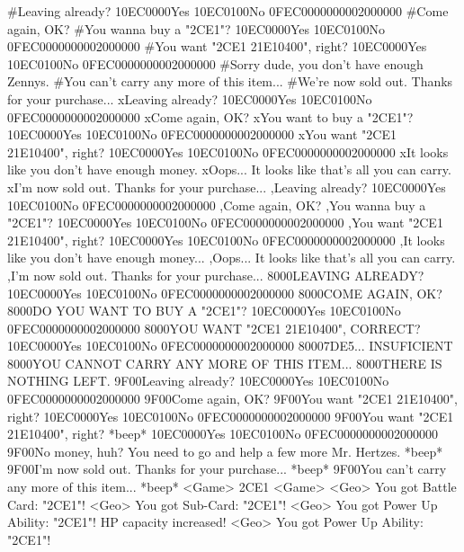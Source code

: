 #Leaving already? {10}{EC}{00}{00}Yes {10}{EC}{01}{00}No {0F}{EC}{00}{00}{00}{00}{02}{00}{00}{00}
#Come again, OK?
#You wanna buy a "{2C}{E1}"? {10}{EC}{00}{00}Yes {10}{EC}{01}{00}No {0F}{EC}{00}{00}{00}{00}{02}{00}{00}{00}
#You want "{2C}{E1} {21}{E1}{04}{00}", right? {10}{EC}{00}{00}Yes {10}{EC}{01}{00}No {0F}{EC}{00}{00}{00}{00}{02}{00}{00}{00}
#Sorry dude, you don't have enough Zennys. 
#You can't carry any more of this item... 
#We're now sold out. Thanks for your purchase... 
xLeaving already? {10}{EC}{00}{00}Yes {10}{EC}{01}{00}No {0F}{EC}{00}{00}{00}{00}{02}{00}{00}{00}
xCome again, OK?
xYou want to buy a "{2C}{E1}"? {10}{EC}{00}{00}Yes {10}{EC}{01}{00}No {0F}{EC}{00}{00}{00}{00}{02}{00}{00}{00}
xYou want "{2C}{E1} {21}{E1}{04}{00}", right? {10}{EC}{00}{00}Yes {10}{EC}{01}{00}No {0F}{EC}{00}{00}{00}{00}{02}{00}{00}{00}
xIt looks like you don't have enough money. 
xOops... It looks like that's all you can carry. 
xI'm now sold out. Thanks for your purchase... 
,Leaving already? {10}{EC}{00}{00}Yes {10}{EC}{01}{00}No {0F}{EC}{00}{00}{00}{00}{02}{00}{00}{00}
,Come again, OK?
,You wanna buy a "{2C}{E1}"? {10}{EC}{00}{00}Yes {10}{EC}{01}{00}No {0F}{EC}{00}{00}{00}{00}{02}{00}{00}{00}
,You want "{2C}{E1} {21}{E1}{04}{00}", right? {10}{EC}{00}{00}Yes {10}{EC}{01}{00}No {0F}{EC}{00}{00}{00}{00}{02}{00}{00}{00}
,It looks like you don't have enough money... 
,Oops... It looks like that's all you can carry. 
,I'm now sold out. Thanks for your purchase... 
{80}{00}LEAVING ALREADY? {10}{EC}{00}{00}Yes {10}{EC}{01}{00}No {0F}{EC}{00}{00}{00}{00}{02}{00}{00}{00}
{80}{00}COME AGAIN, OK?
{80}{00}DO YOU WANT TO BUY A "{2C}{E1}"? {10}{EC}{00}{00}Yes {10}{EC}{01}{00}No {0F}{EC}{00}{00}{00}{00}{02}{00}{00}{00}
{80}{00}YOU WANT "{2C}{E1} {21}{E1}{04}{00}", CORRECT? {10}{EC}{00}{00}Yes {10}{EC}{01}{00}No {0F}{EC}{00}{00}{00}{00}{02}{00}{00}{00}
{80}{00}{7D}{E5}... INSUFICIENT 
{80}{00}YOU CANNOT CARRY ANY MORE OF THIS ITEM... 
{80}{00}THERE IS NOTHING LEFT. 
{9F}{00}Leaving already? {10}{EC}{00}{00}Yes {10}{EC}{01}{00}No {0F}{EC}{00}{00}{00}{00}{02}{00}{00}{00}
{9F}{00}Come again, OK?
{9F}{00}You want "{2C}{E1} {21}{E1}{04}{00}", right? {10}{EC}{00}{00}Yes {10}{EC}{01}{00}No {0F}{EC}{00}{00}{00}{00}{02}{00}{00}{00}
{9F}{00}You want "{2C}{E1} {21}{E1}{04}{00}", right? *beep* {10}{EC}{00}{00}Yes {10}{EC}{01}{00}No {0F}{EC}{00}{00}{00}{00}{02}{00}{00}{00}
{9F}{00}No money, huh? You need to go and help a few more Mr. Hertzes. *beep* 
{9F}{00}I'm now sold out. Thanks for your purchase... *beep* 
{9F}{00}You can't carry any more of this item... *beep* 
<Game> {2C}{E1}
<Game>                         
<Geo> You got Battle Card: "{2C}{E1}"! 
<Geo> You got Sub-Card: "{2C}{E1}"! 
<Geo> You got Power Up Ability: "{2C}{E1}"! 
HP capacity increased! 
<Geo> You got Power Up Ability: "{2C}{E1}"! 
